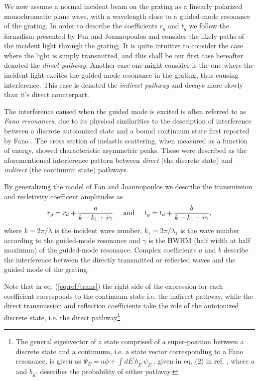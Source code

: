 We now assume a normal incident beam on the grating as a linearly polarized monochromatic plane wave, with a wavelength close to a guided-mode resonance of the grating. In order to describe the coefficients $r_g$ and $t_g$ we follow the formalism presented by Fan and Joannopoulos \cite{Fan-Joannopoulos-guided-mode-resonance} and consider the likely paths of the incident light through the grating. It is quite intuitive to consider the case where the light is simply transmitted, and this shall be our first case hereafter denoted the \emph{direct pathway}. Another case one might consider is the one where the incident light excites the guided-mode resonance in the grating, thus causing interference. This case is denoted the \emph{indirect pathway} and decays more slowly than it's direct counterpart. 

The interference caused when the guided mode is excited is often referred to as \emph{Fano resonances}, due to its physical similarities to the description of interference between a discrete autoionized state and a bound continuum state first reported by Fano \cite{Fano-theory}. The cross section of inelastic scattering, when measured as a function of energy, showed characteristic asymmetric peaks. These were described as the aforementioned interference pattern between \emph{direct} (the discrete state) and \emph{indirect} (the continuum state) pathways. 

By generalizing the model of Fan and Joannopoulos \cite{Fan-Joannopoulos-guided-mode-resonance} we describe the transmission and recletivity coefficent amplitudes as 
\begin{equation}
    r_g = r_d + \frac{a}{k-k_1 + i\gamma} \hspace{0.5cm} \text{and} \hspace{0.5cm} t_g = t_d + \frac{b}{k-k_1+i\gamma},
    \label{eq:ref/trans}
\end{equation}
where $k=2\pi/\lambda$ is the incident wave number, $k_1 = 2\pi/\lambda_1$ is the wave number according to the guided-mode resonance and $\gamma$ is the HWHM (half width at half maximum) of the guided-mode resonance. Complex coefficients $a$ and $b$ describe the interference between the directly transmitted or reflected waves and the guided mode of the grating. 

Note that in eq. (\ref{eq:ref/trans}) the right side of the expression for each coefficient corresponds to the continuum state i.e. the indirect pathway, while the direct transmission and reflection coefficients take the role of the autoionized discrete state, i.e. the direct pathway\footnote{The general eigenvector of a state comprised of a super-position between a discrete state and a continuum, i.e. a state vector corresponding to a Fano resonance, is given as $\Psi_E = a\phi + \int dE^{\prime} b_{E^{\prime}} \psi_{E^{\prime}}$, given in eq. (2) in ref. \cite{Fano-theory}, where $a$ and $b_{E^{\prime}}$ describes the probability of either pathway.} \cite{Fano-theory}

